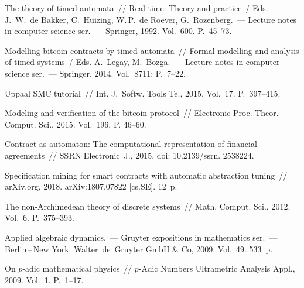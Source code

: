 \begin{multicols}{2}
 {\small\frenchspacing
 {%
 \begin{thebibliography}{99}

 The theory of timed automata~//
 Real-time: Theory and practice~/ Eds. J.~W.~de Bakker, C.~Huizing, W.\,P.~de Roever, 
 G.~Rozenberg.~---
Lecture notes
in computer science ser.~--- Springer, 1992. Vol.~600.  P.~45--73.

Modelling bitcoin contracts by timed automata~//
Formal modelling and analysis of timed systems~/
Eds. A.~Legay, M.~Bozga.~---
Lecture notes in computer science ser.~--- Springer, 2014. Vol.~8711: 
 P.~7--22.

Uppaal SMC tutorial~//
{Int. J.~Softw. Tools Te.}, 2015. Vol.~17. P.~397--415.

Modeling and verification of the bitcoin protocol~//
Electronic Proc. Theor. Comput. Sci., 2015. Vol.~196. P. 46--60.

Contract as automaton: The computational representation of financial
  agreements~//
{SSRN Electronic~J.}, 2015.
doi: 10.2139/\mbox{ssrn}. 2538224.

Specification mining for smart contracts with automatic abstraction
  tuning~// arXiv.org, 2018. arXiv:1807.07822 [cs.SE]. 12~p.

The non-{A}rchimedean theory of discrete systems~//
Math. Comput.  Sci., 2012. Vol.~6. P.~375--393.

{Applied algebraic dynamics.}~---
Gruyter expositions in mathematics ser.~---
Berlin\,--\,New York: Walter~de~Gruyter GmbH \& Co, 2009. Vol.~49. 533~p.


On $p$-adic mathematical physics~//
$p$-Adic Numbers Ultrametric Analysis Appl.,
2009. Vol.~1. P.~1--17.




\end{thebibliography}}}
\end{multicols}
